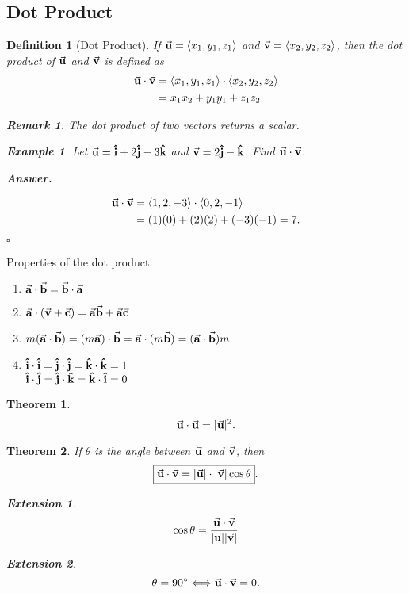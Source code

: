 \documentclass[12pt,a4paper]{article}
\newtheorem{thm}{Theorem}[subsection]
\newtheorem{df}{Definition}[subsection]
\newtheorem{eg}{Example}[subsection]
\newenvironment*{ans}{\par\indent\textbf{\textit{Answer. }}\par}{\par\hfill{$\square$}\par}
\newtheorem*{rmk}{\indent Remark}
\newtheorem*{ext}{\indent Extension}
\def\vecv{\va{v}}
\def\vecu{\va{u}}
\def\veca{\va{a}}
\def\vecb{\va{b}}
\def\vecc{\va{c}}
\def\veci{\vu{\boldsymbol{\textbf{i}}}}
\def\vecj{\vu{\boldsymbol{\textbf{j}}}}
\def\veck{\vu{\boldsymbol{\textbf{k}}}}
\begin{document}
\subsection{Dot Product}
\begin{df}[Dot Product]
	If $\vecu=\langle x_1,y_1,z_1\rangle$ and $\vecv=\langle x_2,y_2,z_2\rangle$, then the dot product of $\vecu$ and $\vecv$ is defined as \[\begin{aligned}
		\vecu\cdot\vecv&=\langle x_1,y_1,z_1\rangle\cdot\langle x_2,y_2,z_2\rangle\\
		&=x_1x_2+y_1y_1+z_1z_2 
	\end{aligned}\]	
	\begin{rmk} The dot product of two vectors returns a scalar. \end{rmk}
	\begin{eg}
		Let $\vecu=\veci+2\vecj-3\veck$ and $\vecv=2\vecj-\veck$. Find $\vecu\cdot\vecv$.
		\begin{ans}
			\[\begin{aligned}
			\vecu\cdot\vecv&=\langle1,2,-3\rangle\cdot\langle0,2,-1\rangle\\
				&=(1)(0)+(2)(2)+(-3)(-1)=7.
			\end{aligned}\]	
		\end{ans}
	\end{eg}
\end{df}
Properties of the dot product: 
\begin{enumerate}
	\item $\veca\cdot\vecb=\vecb\cdot\veca$
	\item $\veca\cdot(\vecv+\vecc)=\veca\vecb+\veca\vecc$
	\item $m(\veca\cdot\vecb)=(m\veca)\cdot\vecb=\veca\cdot(m\vecb)=(\veca\cdot\vecb)m$
	\item $\veci\cdot\veci=\vecj\cdot\vecj=\veck\cdot\veck=1$\\$\veci\cdot\vecj=\vecj\cdot\veck=\veck\cdot\veci=0$
\end{enumerate}
\begin{thm}
	\[\vecu\cdot\vecu=|\vecu|^2.\]	
\end{thm}
\begin{thm}
	If $\theta$ is the angle between $\vecu$ and $\vecv$, then \[\boxed{\vecu\cdot\vecv=|\vecu|\cdot|\vecv|\cos\theta}.\]
	\begin{ext} \[\cos\theta=\frac{\vecu\cdot\vecv}{|\vecu||\vecv|}\]\end{ext}
	\begin{ext} \[\theta=90^\circ\Longleftrightarrow\vecu\cdot\vecv=0.\]	\end{ext}
\end{thm}
\end{document}
